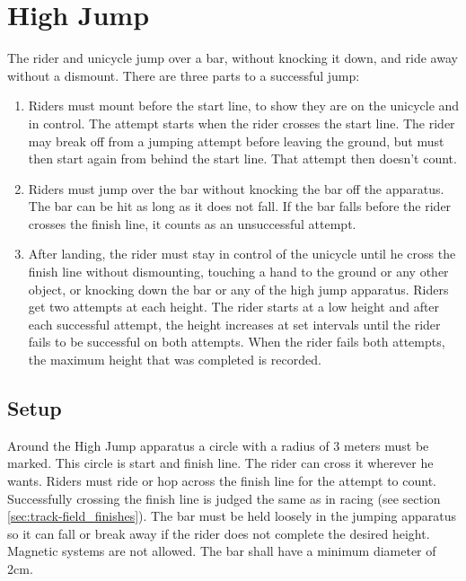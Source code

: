 \section{High Jump}
The rider and unicycle jump over a bar, without knocking it down, and ride away without a dismount.
There are three parts to a successful jump: 
\begin{enumerate}
\item Riders must mount before the start line, to show they are on the unicycle and in control.
The attempt starts when the rider crosses the start line.
The rider may break off from a jumping attempt before leaving the ground, but must then start again from behind the start line.
That attempt then doesn't count.
\item Riders must jump over the bar without knocking the bar off the apparatus.
The bar can be hit as long as it does not fall.
If the bar falls before the rider crosses the finish line, it counts as an unsuccessful attempt.
\item After landing, the rider must stay in control of the unicycle until he cross the finish line without dismounting, touching a hand to the ground or any other object, or knocking down the bar or any of the high jump apparatus.
Riders get two attempts at each height.
The rider starts at a low height and after each successful attempt, the height increases at set intervals until the rider fails to be successful on both attempts.
When the rider fails both attempts, the maximum height that was completed is recorded.
\end{enumerate}

\subsection{Setup}
Around the High Jump apparatus a circle with a radius of 3 meters must be marked.
This circle is start and finish line.
The rider can cross it wherever he wants.
Riders must ride or hop across the finish line for the attempt to count.
Successfully crossing the finish line is judged the same as in racing (see section \ref{sec:track-field_finishes}).
The bar must be held loosely in the jumping apparatus so it can fall or break away if the rider does not complete the desired height.
Magnetic systems are not allowed.
The bar shall have a minimum diameter of 2cm.

